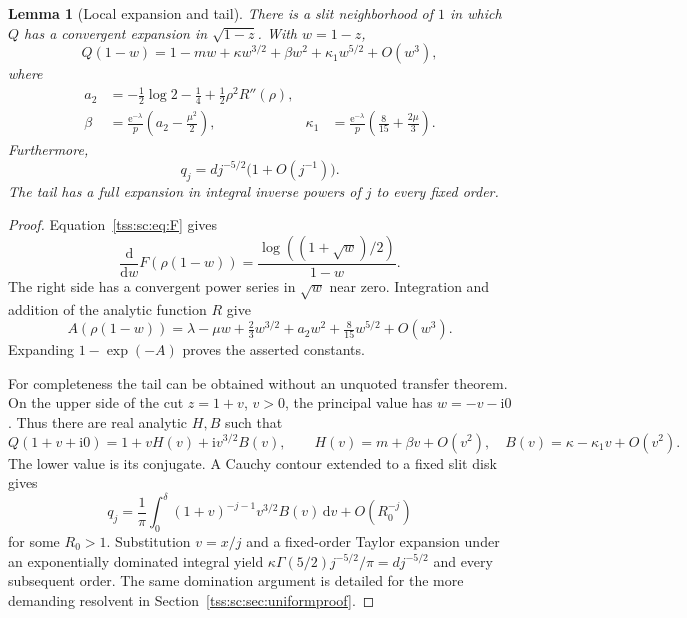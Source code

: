 \documentclass[11pt]{article}
\newtheorem{lemma}[theorem]{Lemma}
\theoremstyle{remark}\newtheorem{remark}[theorem]{Remark}
\theoremstyle{definition}\newtheorem{definition}[theorem]{Definition}
\newcommand{\ii}{\mathrm i}
\newcommand{\dd}{\mathrm d}
\newcommand{\e}{\mathrm e}
\begin{document}
\begin{lemma}[Local expansion and tail]\label{tss:sc:lem:local}
There is a slit neighborhood of $1$ in which $Q$ has a convergent expansion in $\sqrt{1-z}$. With $w=1-z$,
\begin{equation}\label{tss:sc:eq:Qlocal}
 Q(1-w)=1-mw+\kappa w^{3/2}+\beta w^2+\kappa_1w^{5/2}+O(w^3),
\end{equation}
where
\begin{align}
 a_2&=-\tfrac12\log2-\tfrac14+\tfrac12\rho^2R''(\rho),\label{tss:sc:eq:a2}\\
 \beta&=\frac{\e^{-\lambda}}p\left(a_2-\frac{\mu^2}{2}\right),&
 \kappa_1&=\frac{\e^{-\lambda}}p\left(\frac8{15}+\frac{2\mu}{3}\right).
 \label{tss:sc:eq:betak1}
\end{align}
Furthermore,
\begin{equation}\label{tss:sc:eq:qtail}
 q_j=dj^{-5/2}\bigl(1+O(j^{-1})\bigr).
\end{equation}
The tail has a full expansion in integral inverse powers of $j$ to every fixed order.
\end{lemma}
\begin{proof}
Equation~\eqref{tss:sc:eq:F} gives
\[
 \frac{\dd}{\dd w}F(\rho(1-w))
 =\frac{\log((1+\sqrt w)/2)}{1-w}.
\]
The right side has a convergent power series in $\sqrt w$ near zero. Integration and addition of the analytic function $R$ give
\[
 A(\rho(1-w))=\lambda-\mu w+\tfrac23w^{3/2}
                 +a_2w^2+\tfrac8{15}w^{5/2}+O(w^3).
\]
Expanding $1-\exp(-A)$ proves the asserted constants.

For completeness the tail can be obtained without an unquoted transfer theorem. On the upper side of the cut $z=1+v$, $v>0$, the principal value has $w=-v-\ii0$. Thus there are real analytic $H,B$ such that
\begin{equation}\label{tss:sc:eq:HB}
 Q(1+v+\ii0)=1+vH(v)+\ii v^{3/2}B(v),\qquad
 H(v)=m+\beta v+O(v^2),\quad B(v)=\kappa-\kappa_1v+O(v^2).
\end{equation}
The lower value is its conjugate. A Cauchy contour extended to a fixed slit disk gives
\[
 q_j=\frac1\pi\int_0^\delta(1+v)^{-j-1}v^{3/2}B(v)\,\dd v+O(R_0^{-j})
\]
for some $R_0>1$. Substitution $v=x/j$ and a fixed-order Taylor expansion under an exponentially dominated integral yield
$\kappa\Gamma(5/2)j^{-5/2}/\pi=dj^{-5/2}$ and every subsequent order. The same domination argument is detailed for the more demanding resolvent in Section~\ref{tss:sc:sec:uniformproof}.
\end{proof}
\end{document}
